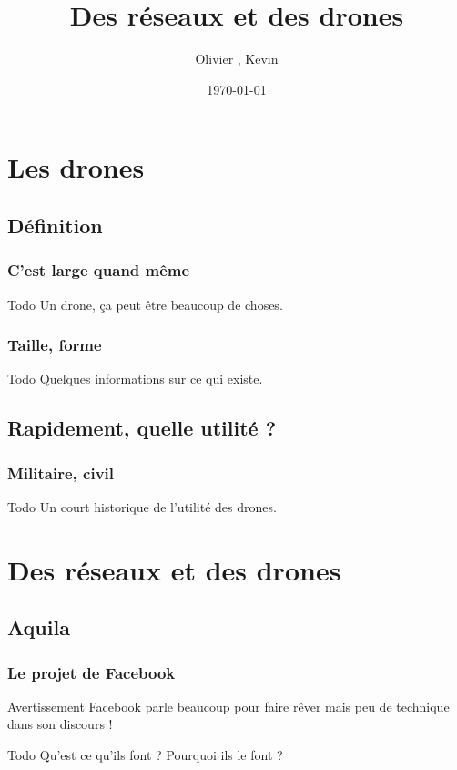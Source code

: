 \documentclass{beamer}
\title{Des réseaux et des drones}
\author{Olivier \bsc{Boissard}, Kevin \bsc{Boulala}}
\institute{Université de Franche Comté}
\date{\today}
\begin{document}
\begin{frame}
  \titlepage
\end{frame}

\begin{frame}
	\tableofcontents[]
\end{frame}

\section{Les drones}
\subsection{Définition}
\begin{frame}
  \frametitle{C'est large quand même}
  \begin{block}{Todo}
    Un drone, ça peut être beaucoup de choses.
  \end{block}
\end{frame}

\begin{frame}
  \frametitle{Taille, forme}
  \begin{block}{Todo}
    Quelques informations sur ce qui existe.
  \end{block}
\end{frame}

\subsection{Rapidement, quelle utilité ?}
\begin{frame}
  \frametitle{Militaire, civil}
  \begin{block}{Todo}
    Un court historique de l'utilité des drones.
  \end{block}
\end{frame}

\section{Des réseaux et des drones}
\begin{frame}
	\tableofcontents[currentsection]
\end{frame}

\subsection{Aquila}
\begin{frame}
  \frametitle{Le projet de Facebook}
  \begin{alertblock}{Avertissement}
    Facebook parle beaucoup pour faire rêver mais peu de technique dans son discours !
  \end{alertblock}
  \begin{block}{Todo}
    Qu'est ce qu'ils font ? Pourquoi ils le font ?
  \end{block}
\end{frame}
\end{document}
